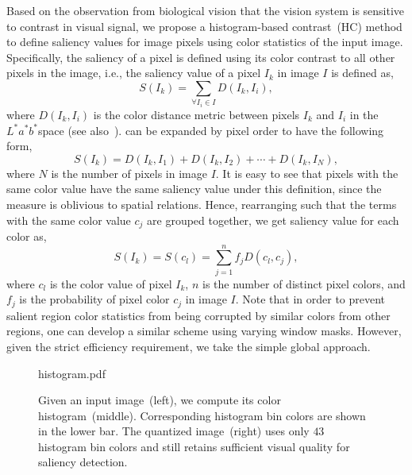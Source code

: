 \documentclass[final]{cvpr}
\newcommand{\Lab}{$L^*a^*b^*$}
\newcommand{\vnudge}{\vspace*{-.1in}}
\begin{document}
Based on the observation from biological vision that the vision system is sensitive to contrast in visual signal,
we propose a histogram-based contrast~(HC) method to define saliency values
for image pixels using color statistics of the input image.
%
Specifically, the saliency of a pixel is defined using its color contrast to all other pixels in the image,
i.e., the saliency value of a pixel $I_k$ in image $I$ is defined as,
\begin{equation}\label{equ:PixelColorContrast}
    S(I_k) = \sum_{\forall I_i \in I} D(I_k, I_i),
\end{equation}
where $D(I_k, I_i)$ is the color distance metric between pixels $I_k$ and $I_i$ in the
\Lab space (see also~\cite{06acmmm/ZhaiS_spatiotemporal}).
%
%
 can be expanded by pixel order to have the following
form,
\begin{equation}\label{equ:PixelCCPixelOrder}
    S(I_k) = D(I_k, I_1) + D(I_k, I_2) + \cdots + D(I_k, I_N),
\end{equation}where $N$ is the number of pixels in image $I$.
%
It is easy to see that pixels with the same color value have the same saliency value
under this definition, since the measure is oblivious to spatial relations. Hence,
rearranging  such that the terms with the same color value
$c_j$ are grouped together, we get saliency value for each color as,
\begin{equation}\label{equ:PixelCCColorOrder}
    S(I_k) = S(c_l) = \sum_{j=1}^{n}{f_j D(c_l, c_j)},
\end{equation}
where $c_l$ is the color value of pixel $I_k$, $n$ is the number of distinct pixel colors, and
$f_j$ is the probability of pixel color $c_j$ in image $I$.
%
Note that in order to prevent salient region color statistics from being corrupted by
similar colors from other regions, one can develop a similar scheme using varying window
masks. However, given the strict efficiency requirement, we take the simple global
approach.


\begin{figure}
  	\begin{overpic}[width=\columnwidth]{histogram.pdf}
    \end{overpic}
    \caption{Given an input image~(left), we compute its color histogram~(middle).
      Corresponding histogram bin colors are shown in the lower bar.
      The quantized image~(right) uses only  $43$ histogram bin colors
      and still retains sufficient visual quality for saliency detection.
    }\label{fig:colorFre} \vnudge
\end{figure}
\end{document}

